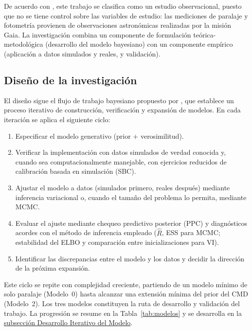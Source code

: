 \documentclass[stu, 12pt, letterpaper, donotrepeattitle, floatsintext, natbib]{apa7_ula}
\begin{document}
De acuerdo con \citet{Cox_Donnelly_2011}, este trabajo se clasifica como
un estudio observacional, puesto que no se tiene control sobre las
variables de estudio: las mediciones de paralaje y fotometría provienen
de observaciones astronómicas realizadas por la misión Gaia. La
investigación combina un componente de formulación teórica-metodológica
(desarrollo del modelo bayesiano) con un componente empírico (aplicación
a datos simulados y reales, y validación).

\subsection{Diseño de la investigación}

El diseño sigue el flujo de trabajo bayesiano propuesto por
\citet{gelman2020bayesian}, que establece un
proceso iterativo de construcción, verificación y expansión de modelos.
En cada iteración se aplica el siguiente ciclo:

\begin{enumerate}
    \item Especificar el modelo generativo (prior $+$ verosimilitud).
    \item Verificar la implementación con datos simulados de verdad
    conocida y, cuando sea computacionalmente manejable, con ejercicios
    reducidos de calibración basada en simulación (SBC).
    \item Ajustar el modelo a datos (simulados primero, reales después)
    mediante inferencia variacional o, cuando el tamaño del problema
    lo permita, mediante MCMC.
    \item Evaluar el ajuste mediante chequeo predictivo posterior (PPC)
    y diagnósticos acordes con el método de inferencia empleado
    ($\hat{R}$, ESS para MCMC; estabilidad del ELBO y comparación entre
    inicializaciones para VI).
    \item Identificar las discrepancias entre el modelo y los datos y
    decidir la dirección de la próxima expansión.
\end{enumerate}

Este ciclo se repite con complejidad creciente, partiendo de un modelo
mínimo de solo paralaje (Modelo~0) hasta alcanzar una extensión mínima
del prior del CMD (Modelo~2). Los tres modelos constituyen la ruta de
desarrollo y validación del trabajo. La progresión se resume en la
Tabla~\ref{tab:modelos} y se desarrolla en la
\hyperref[sec:iterativo]{subsección Desarrollo Iterativo del Modelo}.
\end{document}
